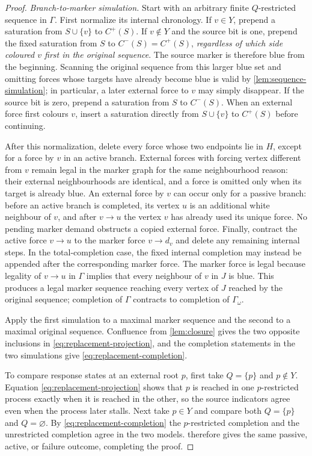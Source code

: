 \documentclass[11pt,reqno]{amsart}
\theoremstyle{definition}
\begin{document}
\begin{proof}
\smallskip
\noindent\emph{Branch-to-marker simulation.}
Start with an arbitrary finite $Q$-restricted sequence in $\Gamma$.  First
normalize its internal chronology.  If $v\in Y$, prepend a saturation from
$S\cup\{v\}$ to $C^+(S)$.  If $v\notin Y$ and the source bit is one, prepend
the fixed saturation from $S$ to $C^-(S)=C^+(S)$, \emph{regardless of which
side coloured $v$ first in the original sequence}.  The source marker is
therefore blue from the beginning.  Scanning the original sequence from this
larger blue set and omitting forces whose targets have already become blue is
valid by \cref{lem:sequence-simulation}; in particular, a later external
force to $v$ may simply disappear.  If the source bit is zero, prepend a
saturation from $S$ to $C^-(S)$.  When an external force first colours $v$,
insert a saturation directly from $S\cup\{v\}$ to $C^+(S)$ before continuing.

After this normalization, delete every force whose two endpoints lie in
$H$, except for a force by $v$ in an active branch.  External forces with
forcing vertex different from $v$ remain legal in the marker graph for the
same neighbourhood reason: their external neighbourhoods are identical, and
a force is omitted only when its target is already blue.  An external force
by $v$ can occur only for a passive
branch: before an active branch is completed, its vertex $u$ is an additional
white neighbour of $v$, and after $v\to u$ the vertex $v$ has already used its
unique force.  No pending marker demand obstructs a copied external
force.  Finally, contract the active force $v\to u$ to the marker force
$v\to d_v$ and delete any remaining internal steps.  In the total-completion
case, the fixed internal completion may instead be appended after the
corresponding marker force.  The marker force is legal because legality of
$v\to u$ in $\Gamma$ implies that every neighbour of $v$ in $J$ is blue.
This produces a legal marker sequence reaching every vertex of $J$ reached by
the original sequence; completion of $\Gamma$ contracts to completion of
$\Gamma_\omega$.

Apply the first simulation to a maximal marker sequence and the second to a
maximal original sequence.  Confluence from \cref{lem:closure} gives the two
opposite inclusions in \eqref{eq:replacement-projection}, and the completion
statements in the two simulations give \eqref{eq:replacement-completion}.

To compare response states at an external root $p$, first take $Q=\{p\}$ and
$p\notin Y$.  Equation \eqref{eq:replacement-projection} shows that $p$ is
reached in one $p$-restricted process exactly when it is reached in the
other, so the source indicators agree even when the process later stalls.
Next take $p\in Y$ and compare both $Q=\{p\}$ and $Q=\varnothing$.
By \eqref{eq:replacement-completion} the $p$-restricted completion and the
unrestricted completion agree in the two models.  
therefore gives the same passive, active, or
failure outcome, completing the proof.
\end{proof}
\end{document}
